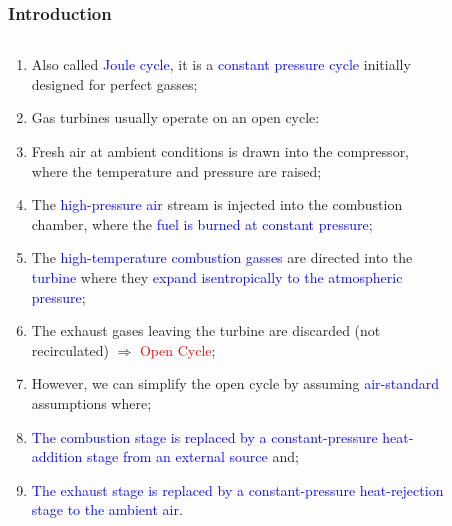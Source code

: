 \documentclass[10pt,compress]{beamer}
\newcommand{\red}{\textcolor{red}}
\newcommand{\blue}{\textcolor{blue}}
\begin{document}
\begin{frame}
 \frametitle{Introduction}
 \begin{columns}
  \begin{column}[c]{0.6\linewidth} 
   \begin{enumerate}[(1)]\scriptsize
    \item<1-> Also called \blue{Joule cycle}, it is a \blue{constant pressure cycle} initially designed for perfect gasses;
    \item<2-> Gas turbines usually operate on an open cycle: 
    \item<2-> Fresh air at ambient conditions is drawn into the compressor, where the temperature and pressure are raised;
    \item<3-> The \blue{high-pressure air} stream is injected into the combustion chamber, where the \blue{fuel is burned at constant pressure}; 
    \item<3-> The \blue{high-temperature combustion gasses} are directed into the \blue{turbine} where they \blue{expand isentropically to the atmospheric pressure};
    \item<3-> The exhaust gases leaving the turbine are discarded (not recirculated) $\Longrightarrow$ \red{Open Cycle};
    \item<4-> However, we can simplify the open cycle by assuming \blue{air-standard} assumptions where;
    \item<4-> \blue{The combustion stage is replaced by a constant-pressure heat-addition stage from an external source} and;
    \item<4-> \blue{The exhaust stage is replaced by a constant-pressure heat-rejection stage to the ambient air}.
   \end{enumerate}
  \end{column}
  \begin{column}[c]{0.4\linewidth}
   \begin{figure}%
     \vbox{
     }
   \end{figure}  
  \end{column}  
 \end{columns}
\end{frame}
\end{document}
